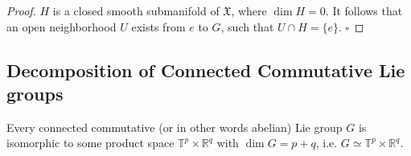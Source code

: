 \documentclass[envcountsect,runningheads]{llncs}
\renewcommand{\qed}{\hfill$\square$}
\begin{document}
\begin{proof}
$H$ is a closed smooth submanifold of $\mathfrak{X}$, where $\dim H = 0$. It follows that an open neighborhood $U$ exists from $e$ to $G$, such that $U \cap H = \{e\}$. \qed
\end{proof}

\subsection{Decomposition of Connected Commutative Lie groups}
\label{decomposition}
\begin{theorem}{\cite[p.~116,~p.~26]{onishchik1993lie,van2003lie}}
\label{connectedcommutativeliegroupdecomposition}
Every connected commutative (or in other words abelian) Lie group $G$ is isomorphic to some product space $\mathbb{T}^p \times \mathbb{R}^q$ with $\dim G = p+q$, i.e. $G \simeq \mathbb{T}^p \times \mathbb{R}^q$.
\end{theorem}
\end{document}
